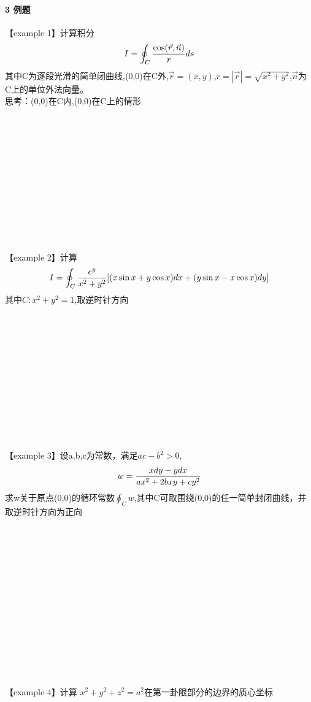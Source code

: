 \documentclass[12pt]{scrartcl}
\begin{document}
{\paragraph*{\large 3 例题}\leavevmode \newline
【example 1】计算积分
\begin{align}
    I=\oint _C\frac{\cos(\vec{r},\vec{n})}{r}ds \notag
\end{align}
其中C为逐段光滑的简单闭曲线,(0,0)在C外,$\vec{r}=(x,y)$,$r=|\vec{r}|=\sqrt{x^2+y^2}$,$\vec{n}$为
C上的单位外法向量。\\
思考：(0,0)在C内,(0,0)在C上的情形
\\
\\
\\
\\
\\
\\
\\
\\
\\
\\
\\
\\
\\
【example 2】计算
\begin{align}
    I=\oint _C\frac{e^y}{x^2+y^2}[(x\sin x+y\cos x)dx+(y\sin x-x\cos x)dy]\notag
\end{align}
其中$C:x^2+y^2=1$,取逆时针方向
\\
\\
\\
\\
\\
\\
\\
\\
\\
\\
\\
\\
\\
【example 3】设a,b,c为常数，满足$ac-b^2>0$,
\begin{align}
    w=\frac{xdy-ydx}{ax^2+2bxy+cy^2} \notag
\end{align}
求w关于原点(0,0)的循环常数$\oint _C w$,其中C可取围绕(0,0)的任一简单封闭曲线，并取逆时针方向为正向
\\
\\
\\
\\
\\
\\
\\
\\
\\
\\
\\
\\
\\
\\
\\
【example 4】计算  $x^2+y^2+z^2=a^2$在第一卦限部分的边界的质心坐标
\\
\\
\\
\\
\\
\\
\\
\\
\newpage
}
\end{document}
